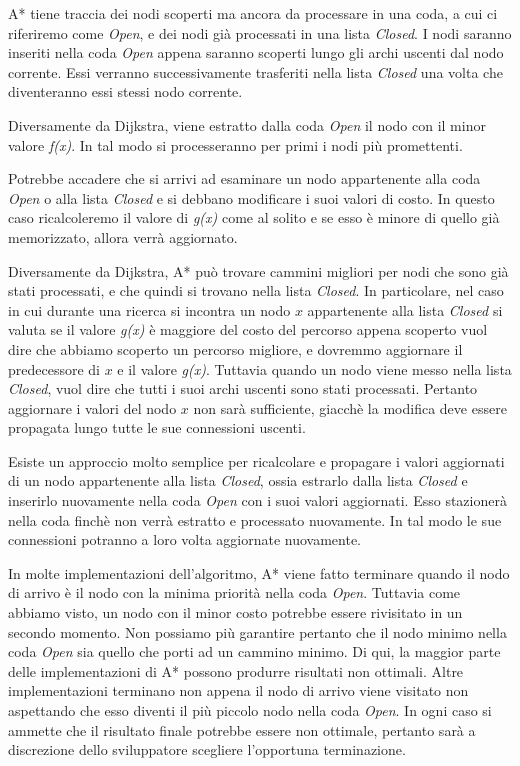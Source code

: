 \documentclass[12pt]{book}
\begin{document}
\par{
A* tiene traccia dei nodi scoperti ma ancora da processare in una coda, a cui ci riferiremo come \emph{Open}, e dei nodi gi\`a processati in una lista \emph{Closed}. I nodi saranno inseriti nella coda \emph{Open} appena saranno scoperti lungo gli archi uscenti dal nodo corrente. Essi verranno successivamente trasferiti nella lista \emph{Closed} una volta che diventeranno essi stessi nodo corrente.
}
\par{Diversamente da Dijkstra, viene estratto dalla coda \emph{Open} il nodo con il minor valore \emph{f(x)}. In tal modo si processeranno per primi i nodi pi\`u promettenti.}
\par{Potrebbe accadere che si arrivi ad esaminare un nodo appartenente alla coda \emph{Open} o alla lista \emph{Closed} e si debbano modificare i suoi valori di costo. In questo caso ricalcoleremo il valore di \emph{g(x)} come al solito e se esso \`e minore di quello gi\`a memorizzato, allora verr\`a aggiornato.}
\par{Diversamente da Dijkstra, A* pu\`o trovare cammini migliori per nodi che sono gi\`a stati processati, e che quindi si trovano nella lista \emph{Closed}. In particolare, nel caso in cui durante una ricerca si incontra un nodo $x$ appartenente alla lista \emph{Closed} si valuta se il valore \emph{g(x)} \`e maggiore del costo del percorso appena scoperto vuol dire che abbiamo scoperto un percorso migliore, e dovremmo aggiornare il predecessore di $x$ e il valore \emph{g(x)}. Tuttavia quando un nodo viene messo nella lista \emph{Closed}, vuol dire che tutti i suoi archi uscenti sono stati processati. Pertanto aggiornare i valori del nodo $x$ non sar\`a sufficiente, giacch\`e la modifica deve essere propagata lungo tutte le sue connessioni uscenti.}
\par{Esiste un approccio molto semplice per ricalcolare e propagare i valori aggiornati di un nodo appartenente alla lista \emph{Closed}, ossia estrarlo dalla lista \emph{Closed} e inserirlo nuovamente nella coda \emph{Open} con i suoi valori aggiornati. Esso stazioner\`a nella coda finch\`e non verr\`a estratto e processato nuovamente. In tal modo le sue connessioni potranno a loro volta aggiornate nuovamente.}
\par{In molte implementazioni dell'algoritmo, A* viene fatto terminare quando il nodo di arrivo \`e il nodo con la minima priorit\`a nella coda \emph{Open}. Tuttavia come abbiamo visto, un nodo con il minor costo potrebbe essere rivisitato in un secondo momento. Non possiamo pi\`u garantire pertanto che il nodo minimo nella coda \emph{Open} sia quello che porti ad un cammino minimo. Di qui, la maggior parte delle implementazioni di A* possono produrre risultati non ottimali. Altre implementazioni terminano non appena il nodo di arrivo viene visitato non aspettando che esso diventi il pi\`u piccolo nodo nella coda \emph{Open}. In ogni caso si ammette che il risultato finale potrebbe essere non ottimale, pertanto sar\`a a discrezione dello sviluppatore scegliere l'opportuna terminazione.}
%
\end{document}
